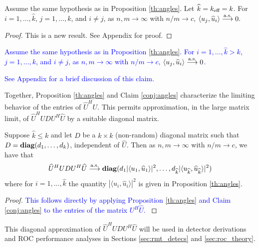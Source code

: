 \begin{Th}\label{th:other angles}
Assume the same hypothesis as in Proposition \ref{th:angles}. Let $\widehat{k}=k_\text{eff}=k$. For $i=1,\dots,\widehat{k}$, $j=1,\dots,k$, and $i\neq j$, as $n,m\to\infty$ with $n/m\to c$, $\langle u_j,\widehat{u}_i\rangle \overset{\textrm{a.s.}}{\longrightarrow} 0.$
\end{Th}
\begin{proof}
This is a new result. See Appendix for proof.
\end{proof}\vskip0.25cm

\textcolor{blue}{\begin{Conj}\label{conj:angles}
Assume the same hypothesis as in Proposition \ref{th:angles}. For $i=1,\dots,\widehat{k} >  k$, $j=1,\dots,k$, and $i\neq j$, as $n,m\to\infty$ with $n/m\to c$, $\langle u_j,\widehat{u}_i\rangle \overset{\textrm{a.s.}}{\longrightarrow} 0$.
\end{Conj}
\begin{Remark}
See Appendix for a brief discussion of this claim.
\end{Remark}}

Together, Proposition \ref{th:angles} and Claim \ref{conj:angles} characterize the limiting behavior of the entries of $\widehat{U}^HU$. This permits approximation, in the large matrix limit, of  $\widehat{U}^HU D U^H\widehat{U}$ by a suitable diagonal matrix.

\begin{Corr}\label{corr:matrix}
Suppose $\widehat{k}\leq k$ and let $D$ be a $k \times k$ (non-random) diagonal matrix such that $D=\mathop{\bf diag}(d_1,\ldots,d_{k})$, independent of $\widehat{U}$. Then as $n,m \longrightarrow \infty$ with $n/m \to c$, we have that
\begin{equation*}
\widehat{U}^HU D U^H\widehat{U}\overset{\textrm{a.s.}}{\longrightarrow} \mathop{\bf diag}(d_1 |\langle u_1,\widehat{u}_1\rangle|^2,\dots, d_{\widehat{k}} |\langle u_{\widehat{k}},\widehat{u}_{\widehat{k}}\rangle|^2)
\end{equation*}
where for $i=1,\dots,\widehat{k}$ the quantity $|\langle u_i,\widehat{u}_i\rangle|^2$ is given in Proposition \ref{th:angles}.
\end{Corr}
\begin{proof}
\textcolor{blue}{This follows directly by applying Proposition \ref{th:angles} and Claim \ref{conj:angles} to the entries of the matrix $U^H\widehat{U}$. }
\end{proof}

This diagonal approximation of $\widehat{U}^HU D U^H\widehat{U}$ will be used in detector derivations and ROC performance analyses in Sections \ref{sec:rmt_detecs} and \ref{sec:roc_theory}.

